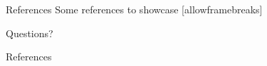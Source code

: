 \documentclass[10pt]{beamer}
\begin{document}
\begin{frame}{References}
    Some references to showcase [allowframebreaks] \cite{knuth92,ConcreteMath,Simpson,Er01,greenwade93}
\end{frame}

\begin{frame}[standout]
    Questions?
\end{frame}

\appendix

\begin{frame}[allowframebreaks]{References}

    
    

\end{frame}
\end{document}
